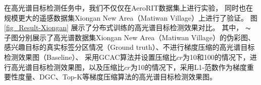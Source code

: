 \documentclass{xdupgthesis}
\begin{document}

在高光谱目标检测任务中，我们不仅仅在AeroRIT数据集上进行实验，
同时也在规模更大的遥感数据集Xiongan New Area（Matiwan Village）上进行了验证。
图 \ref{fig_Result-Xiongan} 展示了分布式训练的高光谱目标检测效果对比。
其中，
 $\thicksim$ 
子图分别展示了高光谱数据集Xiongan New Area（Matiwan Village）的伪彩图、感兴趣目标的真实标签分区情况（Ground truth）、不进行梯度压缩的高光谱目标检测效果图（Baseline）、
采用GCAC算法并设置压缩比$cr$为10和100的情况下，进行高光谱目标检测效果图，以及压缩比$cr$为10的情况下，采用L1-范数作为梯度重要性度量、DGC、Top-K等梯度压缩算法的高光谱目标检测效果图。

\begin{figure}[ht]
    \centering
     \\
\end{figure}
\end{document}
